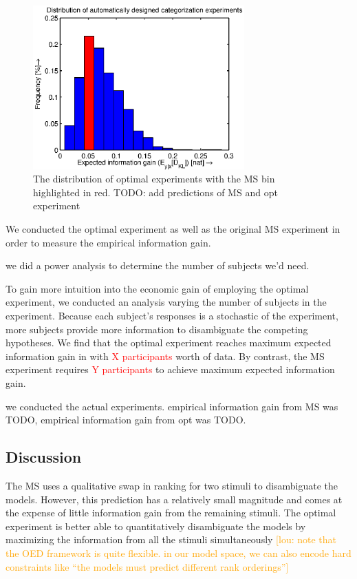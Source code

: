 \documentclass{article}
\newcommand{\red}[1]{\textcolor{Red}{#1}}
\newcommand{\lou}[1]{\textcolor{orange}{[lou: #1]}}
\newcommand{\cas}[1]{ \textsf{\color{darkgray} \scriptsize #1} }
\begin{document}
\begin{figure}[h!]
\centering
\includegraphics[width=3.2in]{img/dist.eps}
\caption{The distribution of optimal experiments with the MS bin highlighted in red. TODO: add predictions of MS and opt experiment}
\label{fig:dist}
\end{figure}



We conducted the optimal experiment as well as the original MS experiment in order to measure the empirical information gain.

\cas{we did a power analysis to determine the number of subjects we'd need.}

To gain more intuition into the economic gain of employing the optimal experiment, we conducted an analysis varying the number of subjects in the experiment. Because each subject's responses is a stochastic of the experiment, more subjects provide more information to disambiguate the competing hypotheses. We find that the optimal experiment reaches maximum expected information gain in with \red{X participants} worth of data. By contrast, the MS experiment requires \red{Y participants} to achieve maximum expected information gain.


\cas{we conducted the actual experiments. empirical information gain from MS was TODO, empirical information gain from opt was TODO.}

\subsection{Discussion}

The MS uses a qualitative swap in ranking for two stimuli to disambiguate the models.
However, this prediction has a relatively small magnitude and comes at the expense of little information gain from the remaining stimuli.
The optimal experiment is better able to quantitatively disambiguate the models by maximizing the information from all the stimuli simultaneously
\lou{note that the OED framework is quite flexible. in our model space, we can also encode hard constraints like ``the models must predict different rank orderings''}
\end{document}

